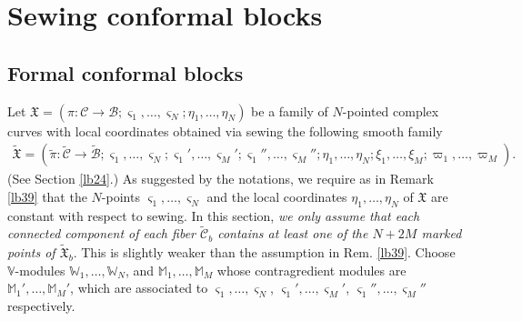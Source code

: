 \documentclass[12pt,b5paper,notitlepage]{report}
\theoremstyle{definition}
\theoremstyle{plain}
\newcommand{\fk}{\mathfrak}
\newcommand{\mc}{\mathcal}
\newcommand{\wtd}{\widetilde}
\newcommand{\sgm}{\varsigma}
\newcommand{\Vbb}{\mathbb V}
\newcommand{\Wbb}{\mathbb W}
\newcommand{\Mbb}{\mathbb M}
\numberwithin{equation}{section}
\begin{document}
\section{Sewing  conformal blocks}\label{lb76}


\subsection*{Formal conformal blocks}


Let $\fk X=(\pi:\mc C\rightarrow\mc B;\sgm_1,\dots,\sgm_N;\eta_1,\dots,\eta_N)$ be a family of $N$-pointed complex curves with local coordinates obtained via sewing the following smooth family
\begin{align*}
\wtd{\fk X}=(\wtd\pi:\wtd{\mc C}\rightarrow\wtd{\mc B};\sgm_1,\dots,\sgm_N;\sgm_1',\dots,\sgm_M';\sgm_1'',\dots,\sgm_M'';\eta_1,\dots,\eta_N;\xi_1,\dots,\xi_M;\varpi_1,\dots,\varpi_M).
\end{align*}
(See Section \ref{lb24}.) As suggested by the notations, we require as in Remark \ref{lb39} that the $N$-points  $\sgm_1,\dots,\sgm_N$ and the local coordinates $\eta_1,\dots,\eta_N$ of $\fk X$ are constant with respect to sewing. In this section, \emph{we only assume that each connected component of each fiber $\wtd{\mc C}_b$ contains at least one of the $N+2M$ marked points of $\wtd{\fk X}_b$}. This is slightly weaker than the assumption in Rem. \ref{lb39}. Choose $\Vbb$-modules $\Wbb_1,\dots,\Wbb_N$, and $\Mbb_1,\dots,\Mbb_M$ whose contragredient modules are $\Mbb_1',\dots,\Mbb_M'$, which are associated to $\sgm_1,\dots,\sgm_N$, $\sgm_1',\dots,\sgm_M'$, $\sgm_1'',\dots,\sgm_M''$ respectively.
\end{document}
